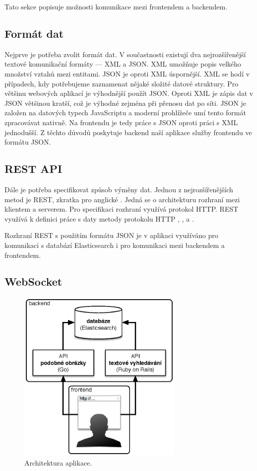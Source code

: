 Tato sekce popisuje možnosti komunikace mezi frontendem a backendem.

\subsection{Formát dat}

Nejprve je potřeba zvolit formát dat. V součastnosti existují dva nejrozšířenější textové komunikační formáty --- XML\cite{xml} a JSON\cite{json}. XML umožňuje popis velkého množství vztahů mezi entitami. JSON je oproti XML úspornější. XML se hodí v případech, kdy potřebujeme zaznamenat nějaké složité datové struktury. Pro většinu webových aplikací je výhodnější použít JSON. Oproti XML je zápis dat v JSON většinou kratší, což je výhodné zejména při přenosu dat po síti. JSON je založen na datových typech JavaScriptu a moderní prohlížeče umí tento formát zpracovávat nativně. Na frontendu je tedy práce s JSON oproti  práci s XML jednodušší. Z těchto důvodů poskytuje backend naší aplikace služby frontendu ve formátu JSON.

\subsection{REST API}

Dále je potřeba specifikovat způsob výměny dat. Jednou z nejrozšířenějších metod je REST, zkratka pro anglické . Jedná se o architekturu rozhraní mezi klientem a serverem. Pro specifikaci rozhraní využívá protokol HTTP. REST využívá k definici práce s daty metody protokolu HTTP , ,  a .

Rozhraní REST\cite{rest} s použitím formátu JSON je v aplikaci využíváno pro komunikaci s databází Elasticsearch i pro komunikaci mezi backendem a frontendem.

\subsection{WebSocket}

\begin{figure}[h]
  \centering
  \includegraphics[width=80mm]{architecture.eps}
  \caption{Architektura aplikace.}
  \label{fig:architecture}
\end{figure}


